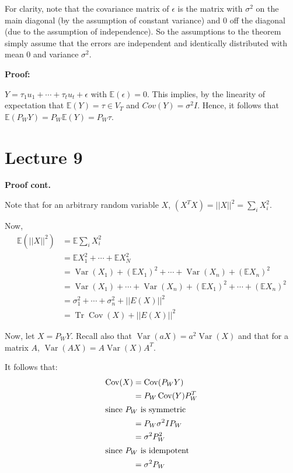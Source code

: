 \documentclass[12pt, oneside]{article}
\newcommand{\E}{\mathbb{E}}
\newcommand{\Var}{\operatorname{Var}}
\newcommand{\Cov}{\operatorname{Cov}}
\DeclareMathOperator{\Tr}{Tr}
\begin{document}
For clarity, note that the covariance matrix of $\epsilon$ is the matrix with $\sigma^{2}$ on the main diagonal 
(by the assumption of constant variance) and 0 off the diagonal (due to the assumption of independence). So the assumptions to the
theorem simply assume that the errors are independent and identically distributed with mean 0 and variance $\sigma^{2}$.

\textbf{Proof: }

$Y = \tau_{1} u_{1} + \cdots + \tau_{t} u_{t} + \epsilon$ with $\mathbb{E} (\epsilon) = 0$. This implies, by the linearity
of expectation that $\mathbb{E} (Y) = \tau \in V_{T}$ and $Cov(Y) = \sigma^{2}I$. Hence, it follows that 
$\mathbb{E} (P_{W}Y) = P_{W} \mathbb{E}(Y) = P_{W} \tau$.

\section{Lecture 9}

\textbf{Proof cont. }

Note that for an arbitrary random variable $X$, $(X^{T}X) = ||X||^{2} = \sum_{i} X_{i}^{2}$. 

Now, 
\begin{align*}
\mathbb{E} (||X||^{2}) &= \mathbb{E} \sum_{i} X_{i}^{2} \\
&= \mathbb{E} X_{1}^{2} + \cdots + \mathbb{E} X_{N}^{2} \\
&= \Var(X_{1}) + (\E X_{1})^{2} + \cdots + \Var(X_{n}) + (\E X_{n})^{2} \\
&= \Var(X_{1}) + \cdots + \Var(X_{n}) + (\E X_{1})^{2} + \cdots + (\E X_{n})^{2}\\ 
&= \sigma_{1}^{2} + \cdots + \sigma_{n}^{2} + ||E(X)||^{2} \\
&= \Tr \Cov (X) + ||E(X)||^{2}
\end{align*}


Now, let $X = P_{W}Y$. Recall also that $\Var (aX) = a^{2} \Var (X)$ and that for a matrix $A$, $\Var(AX) = A \Var(X) A^{T}$.

It follows that:
\begin{align*}
\Cov(X) &= \Cov(P_{W}Y) \\
&= P_{W} \Cov(Y) P^{T}_{W} \\
\intertext{since $P_{W}$ is symmetric}
&= P_{W} \sigma^{2} I P_{W} \\ 
&= \sigma^{2} P^{2}_{W} \\
\intertext{since $P_{W}$ is idempotent}
&= \sigma^{2} P_{W}
\end{align*}
\end{document}
